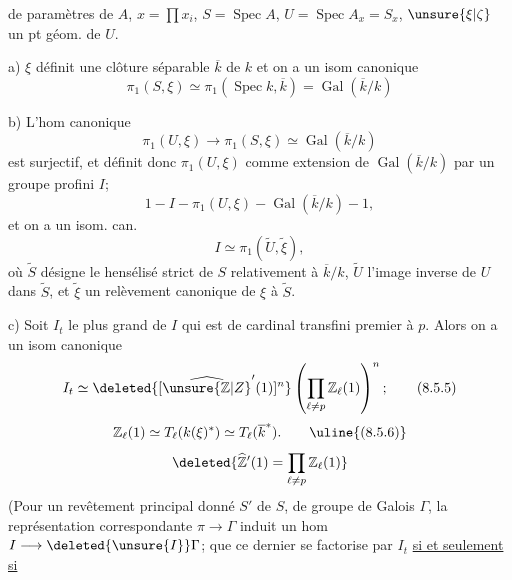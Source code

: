 de paramètres de $A$, $x=\prod x_i$,  $S=\operatorname{Spec}A$, $U=\operatorname{Spec}A_x=S_x$, $\unsure{\xi|\zeta}$ un pt géom. de $U$.

a) $\xi$ définit une clôture séparable $\overline k$ de $k$ et on a un isom canonique
\[
\pi_1(S,\xi)\simeq\pi_1(\operatorname{Spec}k,\overline k)=\operatorname{Gal}(\overline k/k)
\tag*{(8.5.1)}
\]

b) L'hom canonique
\[
\pi_1(U,\xi)\longrightarrow\pi_1(S,\xi)\simeq\operatorname{Gal}(\overline k/k)
\tag*{(8.5.2)}
\]
est surjectif, et définit donc $\pi_1(U,\xi)$ comme extension de $\operatorname{Gal}(\overline k/k)$ par un groupe  profini $I$; 
\[
1-I-\pi_1(U,\xi)-\operatorname{Gal}(\overline k/k)-1,
\tag*{(8.5.3)}
\]
et on a un isom. can.
\[
I\simeq\pi_1(\widetilde U,\widetilde\xi),
\tag*{(8.5.4)}
\]
où $\widetilde S$ désigne le hensélisé strict de $S$ relativement à $\overline k/k$,  $\widetilde U$ l'image inverse de $U$ dans $\widetilde S$, et $\widetilde\xi$ un relèvement canonique de $\xi$ à $\widetilde S$.

c) Soit $I_t$ le plus grand  de $I$ qui est de cardinal transfini premier à $p$. Alors on a un isom canonique
\[
I_t\simeq\deleted{[\widehat{\unsure{\mathbb Z|Z}}'(1)]^n}\left(\prod_{\ell\ne p}\mathbb Z_\ell(1)\right)^n;
\tag*{(8.5.5)}
\]
\[
\mathbb Z_\ell(1)\simeq T_\ell(k(\xi)^*)\simeq T_\ell(\overline k^*).
\tag*{\uline{(8.5.6)}}
\]
\[
\deleted{\widehat{\mathbb Z}'(1)=\prod_{\ell\ne p}\mathbb Z_\ell(1)}
\]
(Pour un revêtement principal donné $S'$ de $S$, de groupe de Galois $\Gamma$, la représentation correspondante $\pi\longrightarrow\Gamma$ induit un hom $I\longrightarrow\deleted{\unsure{I}}\Gamma$; que ce dernier se factorise par $I_t$ \uline{si et seulement si} 
